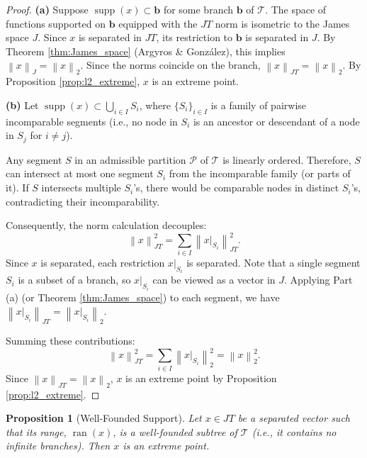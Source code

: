 \documentclass[11pt,a4paper]{amsart}
\newtheorem{proposition}[theorem]{Proposition}
\newcommand{\JT}{JT}
\newcommand{\Tree}{\mathcal{T}}
\newcommand{\norm}[1]{\left\lVert#1\right\rVert}
\newcommand{\supp}{\operatorname{supp}}
\newcommand{\ran}{\operatorname{ran}}
\newcommand{\J}{J}
\begin{document}
\begin{proof}
    \textbf{(a)} Suppose $\supp(x) \subset \mathbf{b}$ for some branch $\mathbf{b}$ of $\Tree$. The space of functions supported on $\mathbf{b}$ equipped with the $\JT$ norm is isometric to the James space $\J$. Since $x$ is separated in $\JT$, its restriction to $\mathbf{b}$ is separated in $\J$. By Theorem \ref{thm:James_space} (Argyros \& González), this implies $\norm{x}_{\J} = \norm{x}_2$. Since the norms coincide on the branch, $\norm{x}_{\JT} = \norm{x}_2$. By Proposition \ref{prop:l2_extreme}, $x$ is an extreme point.

    \textbf{(b)} Let $\supp(x) \subset \bigcup_{i \in I} S_i$, where $\{S_i\}_{i \in I}$ is a family of pairwise incomparable segments (i.e., no node in $S_i$ is an ancestor or descendant of a node in $S_j$ for $i \neq j$).
    
    Any segment $S$ in an admissible partition $\mathcal{P}$ of $\Tree$ is linearly ordered. Therefore, $S$ can intersect at most one segment $S_i$ from the incomparable family (or parts of it). If $S$ intersects multiple $S_i$'s, there would be comparable nodes in distinct $S_i$'s, contradicting their incomparability.
    
    Consequently, the norm calculation decouples:
    \[ \norm{x}_{\JT}^2 = \sum_{i \in I} \norm{x|_{S_i}}_{\JT}^2. \]
    Since $x$ is separated, each restriction $x|_{S_i}$ is separated. Note that a single segment $S_i$ is a subset of a branch, so $x|_{S_i}$ can be viewed as a vector in $\J$. Applying Part (a) (or Theorem \ref{thm:James_space}) to each segment, we have $\norm{x|_{S_i}}_{\JT} = \norm{x|_{S_i}}_2$.
    
    Summing these contributions:
    \[ \norm{x}_{\JT}^2 = \sum_{i \in I} \norm{x|_{S_i}}_2^2 = \norm{x}_2^2. \]
    Since $\norm{x}_{\JT} = \norm{x}_2$, $x$ is an extreme point by Proposition \ref{prop:l2_extreme}.
\end{proof}

\begin{proposition}[Well-Founded Support]
    Let $x \in \JT$ be a separated vector such that its range, $\ran(x)$, is a well-founded subtree of $\Tree$ (i.e., it contains no infinite branches). Then $x$ is an extreme point.
\end{proposition}
\end{document}
